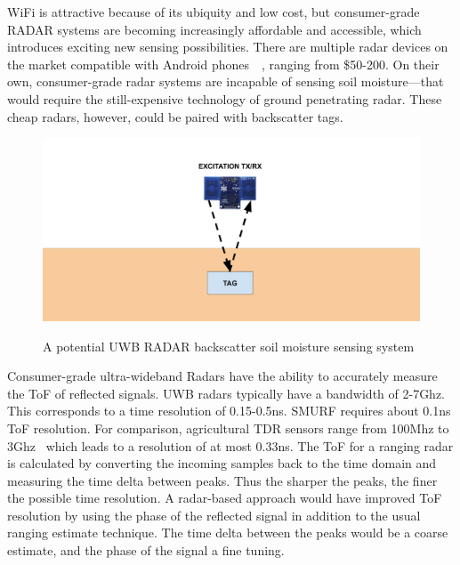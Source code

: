 \documentclass[12pt]{article}
\begin{document}
WiFi is attractive because of its ubiquity and low cost, but
consumer-grade RADAR systems are becoming increasingly affordable and
accessible, which introduces exciting new sensing possibilities. There
are multiple radar devices on the market compatible with Android
phones~\cite{walabot}~\cite{omnipresense}, ranging from \$50-200. On their own,
consumer-grade radar systems are incapable of sensing soil
moisture---that would require the still-expensive technology of ground
penetrating radar. These cheap radars, however, could be paired with
backscatter tags.

\begin{figure}[h!]
  \centering
  \includegraphics[scale=0.25]{soil_moisture_diagram.png}\\
  \caption{A potential UWB RADAR backscatter soil moisture sensing
    system}
\end{figure}

Consumer-grade ultra-wideband Radars have the ability to accurately
measure the ToF of reflected signals. UWB radars typically have a
bandwidth of 2-7Ghz. This corresponds to a time resolution of
0.15-0.5ns. SMURF requires about 0.1ns ToF resolution. For
comparison, agricultural TDR sensors range from 100Mhz to
3Ghz~\cite{Pelletier2012} which leads to a resolution of at most
0.33ns. The ToF for a ranging radar is calculated by converting the
incoming samples back to the time domain and measuring the time delta
between peaks. Thus the sharper the peaks, the finer the possible time
resolution. A radar-based approach would have improved ToF resolution
by using the phase of the reflected signal in addition to the usual
ranging estimate technique. The time delta between the peaks would be
a coarse estimate, and the phase of the signal a fine tuning.

\end{document}
